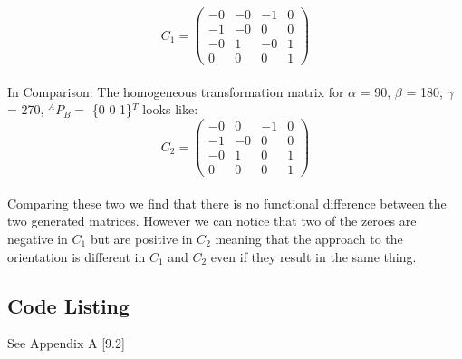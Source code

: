 		$$
		C_{1} =
		\begin{pmatrix}
			-0 & -0 & -1 & 0\\
			-1 & -0 & 0 & 0\\
			-0  & 1  & -0 & 1\\
			0 & 0 & 0 & 1
		\end{pmatrix}
		$$		
		\\
		In Comparison:
		The homogeneous transformation matrix for\newline
		$\alpha$ = 90\degree, 
		$\beta$ = 180\degree, 
		$\gamma$ = 270\degree, $^{A}P_{B} =$ \{0 0 1\}$^{T}$\newline
		looks like:\\
		
		$$
		C_{2} =
		\begin{pmatrix}
			-0 & 0 & -1 & 0\\
			-1 & -0 & 0 & 0\\
			-0  & 1  & 0 & 1\\
			0 & 0 & 0 & 1
		\end{pmatrix}
		$$		
		\\
		Comparing these two we find that there is no functional difference between the two generated matrices. However we can notice that two of the zeroes are negative in $C_{1}$ but are positive in $C_{2}$ meaning that the approach to the orientation is different in $C_{1}$ and $C_{2}$ even if they result in the same thing.
		
		\subsection*{Code Listing}
			See Appendix A [9.2]